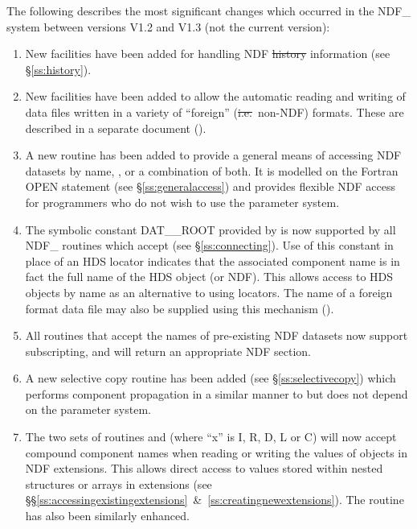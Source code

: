 The following describes the most significant changes which occurred in
the NDF\_ system between versions V1.2 and V1.3 (not the current
version):

\begin{enumerate}

\item New facilities have been added for handling NDF \st{history\/}
information (see \S\ref{ss:history}).

\item New facilities have been added to allow the automatic reading and writing
of data files written in a variety of ``foreign'' (\st{i.e.}\ non-NDF)
formats. These are described in a separate document
().

\item A new routine  has been added to provide a general
means of accessing NDF datasets by name,
, or a combination of
both. It is modelled on the Fortran OPEN statement (see
\S\ref{ss:generalaccess}) and provides flexible NDF access for
programmers who do not wish to use the  parameter system.

\item The symbolic constant DAT\_\_ROOT provided by  is now
supported by all NDF\_ routines which accept  (see
\S\ref{ss:connecting}). Use of this constant in place of an HDS
locator indicates that the associated component name is in fact the
full name of the HDS object (or NDF). This allows access to HDS
objects by name as an alternative to using locators. The name of a
foreign format data file may also be supplied using this mechanism
().

\item All routines that accept the names of pre-existing NDF datasets now
support subscripting, and will return an appropriate NDF section.

\item A new selective copy routine  has been added (see
\S\ref{ss:selectivecopy}) which performs component propagation in a
similar manner to  but does not depend on the
 parameter system.

\item The two sets of routines  and  (where ``x''
is I, R, D, L or C) will now accept compound component names when
reading or writing the values of objects in NDF extensions. This
allows direct access to values stored within nested structures or
arrays in extensions (see
\S\S\ref{ss:accessingexistingextensions}~\&~\ref{ss:creatingnewextensions}).
The routine  has also been similarly enhanced.


\end{enumerate}
